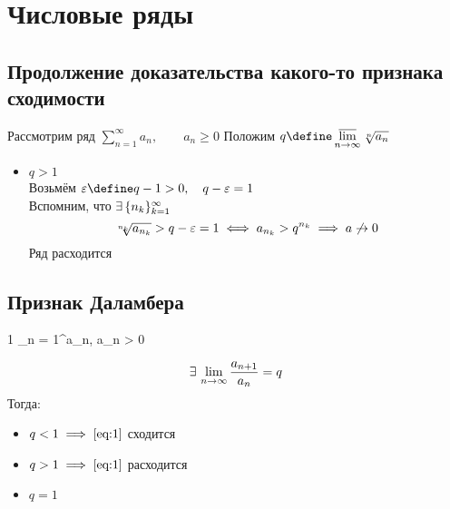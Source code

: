 \chapter{Числовые ряды}

\section{Продолжение доказательства какого-то признака сходимости}

Рассмотрим ряд $\sum_{n = 1}^\infty a_n, \qquad a_n \ge 0 $
Положим $ q \define \ulim_{n \to \infty} \sqrt[n]{a_n} $

\begin{itemize}
	\item $ q > 1 $ \\
	Возьмём $ \veps \define q - 1 > 0, \quad q - \veps = 1 $ \\
	Вспомним, что $ \exists\, \{n_k\}_{k=1}^{\infty} $
	$$ \sqrt[n_k]{a_{n_k}} > q - \varepsilon = 1 \iff a_{n_k} > q^{n_k} \implies a \not\to 0 $$
	Ряд расходится
\end{itemize}

\section{Признак Даламбера}

\begin{theorem}
	\begin{equ}1
		\sum_{n = 1}^\infty a_n, \qquad a_n > 0
	\end{equ}
	$$ \exists\, \lim\limits_{n\to\infty} \frac{a_{n + 1}}{a_n} = q $$
	Тогда:
	\begin{itemize}
		\item $ q < 1 \implies \eref1 $ сходится
		\item $ q > 1 \implies \eref1 $ расходится
		\item $ q = 1 $
	\end{itemize}
\end{theorem}

